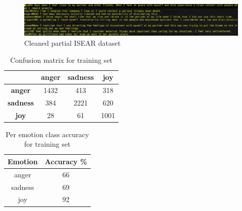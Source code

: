 \begin{center}
	\begin{figure}[ht!]
	\label{fig-clean-dataset}	
	\includegraphics[width=18cm,scale=0.5]{data.png}
	\caption{Cleaned partial ISEAR dataset}
	\end{figure}
\end{center}	
\vspace*{-1cm}
\begin{table}[ht!]
  \centering
  \label{tab-confusion}
  \begin{tabular}{c|c|c|c}
  & \textbf{anger} & \textbf{sadness} & \textbf{joy}\\
  \hline
  \textbf{anger} & 1432 & 413 & 318 \\
  \textbf{sadness} & 384 & 2221 & 620 \\
  \textbf{joy} & 28 & 61 & 1001 \\
  \end{tabular}
  \caption{Confusion matrix for training set}
\end{table}
\vspace*{-0.5cm}
\begin{table}[ht!]
  \centering
  \label{tab-accuracy}
  \begin{tabular}{c|c}
  \textbf{Emotion} & \textbf{Accuracy \%} \\
  \hline
  anger & 66 \\
  sadness & 69 \\
  joy & 92
  \end{tabular}
  \caption{Per emotion class accuracy for training set}
\end{table}

\newpage
